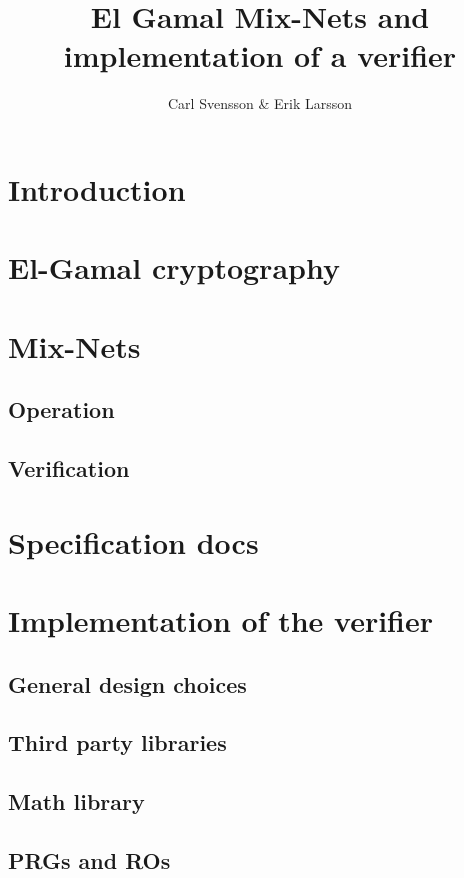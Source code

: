 \documentclass[10pt,a4paper]{article}
\author{Carl Svensson \& Erik Larsson}
\title{El Gamal Mix-Nets and implementation of a verifier}
\begin{document}
\maketitle
\tableofcontents

\section{Introduction}

\section{El-Gamal cryptography}

\section{Mix-Nets}

\subsection{Operation}

\subsection{Verification}

\section{Specification docs}

\section{Implementation of the verifier}

\subsection{General design choices}

\subsection{Third party libraries}

\subsection{Math library}

\subsection{PRGs and ROs}
\end{document}
